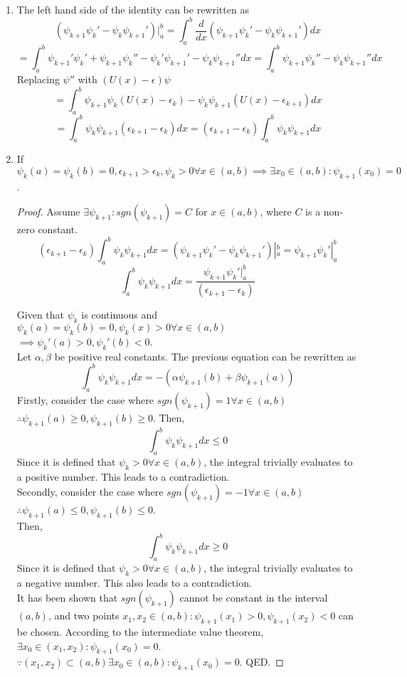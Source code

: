 \begin{sol}
\begin{enumerate}[label=\textbf{(\alph*)}]
\item
The left hand side of the identity can be rewritten as
$$(\psi_{k+1}\psi_k'-\psi_k\psi_{k+1}')|_a^b=\int_a^b \frac{d}{dx}(\psi_{k+1}\psi_k'-\psi_k\psi_{k+1}')dx$$
$$=\int_a^b\psi_{k+1}'\psi_k'+\psi_{k+1}\psi_k''-\psi_k'\psi_{k+1}'-\psi_k\psi_{k+1}''dx
=\int_a^b\psi_{k+1}\psi_k''-\psi_k\psi_{k+1}''dx$$
Replacing $\psi''$ with $(U(x)-\epsilon)\psi$
$$=\int_a^b\psi_{k+1}\psi_k(U(x)-\epsilon_k)-\psi_k\psi_{k+1}(U(x)-\epsilon_{k+1})dx$$
$$=\int_a^b\psi_k\psi_{k+1}(\epsilon_{k+1}-\epsilon_k)dx=(\epsilon_{k+1}-\epsilon_k)\int_a^b\psi_k\psi_{k+1}dx$$
\item
If $\psi_{k}(a)=\psi_{k}(b)=0, \epsilon_{k+1}>\epsilon_k,\psi_{k}>0\forall x\in(a,b)\implies\exists x_0\in(a,b):\psi_{k+1}(x_0)=0$.
\begin{proof}
Assume $\exists\psi_{k+1}: sgn(\psi_{k+1})=C$  for $x\in(a,b)$, where $C$ is a non-zero constant. \\

$$(\epsilon_{k+1}-\epsilon_k)\int_a^b\psi_k\psi_{k+1}dx=(\psi_{k+1}\psi_k'-\psi_k\psi_{k+1}')|_a^b=\psi_{k+1}\psi_k'|_a^b$$
$$\int_a^b\psi_k\psi_{k+1}dx=\frac{\psi_{k+1}\psi_k'|_a^b}{(\epsilon_{k+1}-\epsilon_k)}$$

Given that $\psi_k$ is continuous and $\psi_k(a)=\psi_k(b)=0, \psi_k(x)>0\forall x\in(a,b)$\\ 
$\implies\psi_k'(a)>0,\psi_k'(b)<0$.\\
Let $\alpha,\beta$ be positive real constants. The previous equation can be rewritten as
$$\int_a^b\psi_k\psi_{k+1}dx=-(\alpha\psi_{k+1}(b)+\beta\psi_{k+1}(a))$$
Firstly, consider the case where $sgn(\psi_{k+1})=1\forall x\in(a,b)$ $\therefore \psi_{k+1}(a)\geq 0,\psi_{k+1}(b)\geq 0$. Then,
$$\int_a^b\psi_k\psi_{k+1}dx\leq 0$$
Since it is defined that $\psi_{k}>0\forall x\in(a,b)$, the integral trivially evaluates to a positive number. This leads to a contradiction.\\
Secondly, consider the case where  $sgn(\psi_{k+1})=-1\forall x\in(a,b)$ $\therefore \psi_{k+1}(a)\leq 0,\psi_{k+1}(b)\leq 0$. \\Then,
$$\int_a^b\psi_k\psi_{k+1}dx\geq 0$$
Since it is defined that $\psi_{k}>0\forall x\in(a,b)$, the integral trivially evaluates to a negative number. This also leads to a contradiction.\\ It has been shown that $sgn(\psi_{k+1})$ cannot be constant in the interval $(a,b)$, and two points $x_1,x_2\in(a,b):\psi_{k+1}(x_1)>0,\psi_{k+1}(x_2)<0$ can be chosen. According to the intermediate value theorem, $\exists x_0\in(x_1,x_2):\psi_{k+1}(x_0)=0$. $\because(x_1,x_2)\subset(a,b)\exists x_0\in(a,b):\psi_{k+1}(x_0)=0$. QED.
\end{proof}
\end{enumerate}
\end{sol}